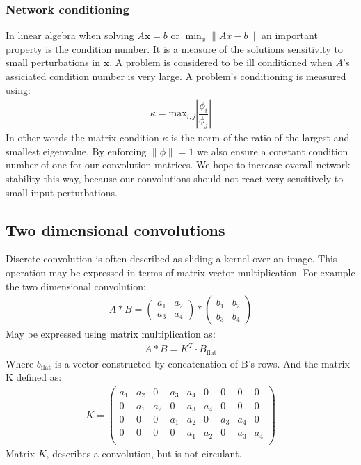 \documentclass{article}
\begin{document}
\subsubsection{Network conditioning}
In linear algebra when solving $A\mathbf{x} = b$ or $\min_x \| Ax - b\|$ an important property
is the condition number. It is a measure of the solutions sensitivity to small perturbations in $\mathbf{x}$. A problem is considered to be ill conditioned when $A$'s assiciated condition number is very large. 
A problem's conditioning is measured using:
\begin{align}
\kappa = \text{max}_{i,j}| \dfrac{\phi_i}{\phi_j}|
\end{align}
In other words the matrix condition $\kappa$ is the norm of the ratio of the largest and smallest eigenvalue. By enforcing $\| \phi \| = 1$ we also ensure a constant condition number of one for our convolution matrices. We hope to increase overall network stability this way, because our convolutions should not react very sensitively to small input perturbations.

\subsection{Two dimensional convolutions}
Discrete convolution is often described as sliding a kernel over an image. This operation may be expressed in terms of matrix-vector multiplication. For example the two dimensional convolution:
\begin{align}
A * B =
\begin{pmatrix}
a_1 & a_2 \\
a_3 & a_4
\end{pmatrix}
*
\begin{pmatrix}
b_1 & b_2 \\
b_3 & b_4
\end{pmatrix}
\end{align}
May be expressed using matrix multiplication as:
\begin{align}
A*B = K^T \cdot B_{\text{flat}}
\end{align}
Where $b_{\text{flat}}$ is a vector constructed by concatenation of B's rows.
And the matrix K defined as:
\begin{align} K =
\begin{pmatrix}
a_1 & a_2 & 0 & a_3 & a_4 & 0   & 0 & 0 &   0 \\
0   & a_1 & a_2 & 0 & a_3 & a_4 & 0 & 0 &   0 \\
0   & 0 & 0 & a_1 & a_2 & 0 & a_3 & a_4 &   0 \\
0   & 0 & 0 & 0   & a_1 & a_2 & 0 & a_3 & a_4 \\
\end{pmatrix}
\end{align}
Matrix $K$, describes a convolution, but is not circulant. 
\end{document}
